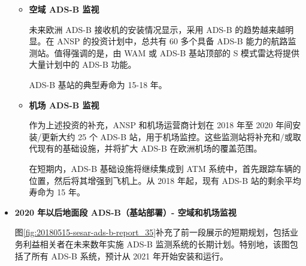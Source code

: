\begin{itemize}

    \begin{itemize}
        \item \textbf{空域 ADS-B 监视}

        未来欧洲 ADS-B 接收机的安装情况显示，采用 ADS-B 的趋势越来越明显。在 ANSP 的投资计划中，总共有 60 多个具备 ADS-B 能力的航路监测站。值得强调的是，由 \acs{WAM} 或 ADS-B 基站顶部的 S 模式雷达将提供大量计划中的 ADS-B 功能。

        ADS-B 基站的典型寿命为 15-18 年。

        \item \textbf{机场 ADS-B 监视}

        作为上述投资的补充，ANSP 和机场运营商计划在 2018 年至 2020 年间安装/更新大约 25 个 ADS-B 站，用于机场监控。这些监测站将补充和/或取代现有的基础设施，并将扩大 ADS-B 在欧洲机场的覆盖范围。

        在短期内，ADS-B 基础设施将继续集成到 ATM 系统中，首先跟踪车辆的位置，然后将其增强到飞机上。从 2018 年起，现有 ADS-B 站的剩余平均寿命为 15 年。
    \end{itemize}

    \item \textbf{2020 年以后地面段 ADS-B（基站部署）- 空域和机场监视}

    图\ref{fig:20180515-sesar-ads-b-report_35}补充了前一段展示的短期规划，包括业务利益相关者在未来数年实施 ADS-B 监测系统的长期计划。特别地，该图包括了所有 ADS-B 系统，预计从 2021 年开始安装和运行。


\end{itemize}
